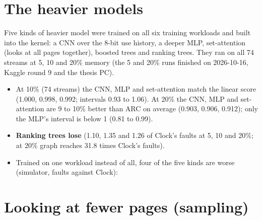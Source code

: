 \documentclass[10.5pt,a4paper]{article}
\begin{document}
\section{The heavier models}
\label{sec:nets}

Five kinds of heavier model were trained on all six training workloads and built into the kernel: a CNN over the 8-bit use history, a deeper MLP, set-attention (looks at all pages together),
boosted trees and ranking trees. They ran on all 74 streams at 5, 10 and 20\% memory (the 5 and 20\% runs finished on 2026-10-16, Kaggle round 9 and the thesis PC).

\begin{table}[h]
\centering\scriptsize
\resizebox{\linewidth}{!}{}
\caption{5\% memory, all 74 streams.}
\end{table}
\begin{table}[h]
\centering\scriptsize
\resizebox{\linewidth}{!}{}
\caption{10\% memory, all 74 streams.}
\end{table}
\begin{table}[h]
\centering\scriptsize
\resizebox{\linewidth}{!}{}
\caption{20\% memory, all 74 streams.}
\end{table}

\begin{itemize}
\item At 10\% (74 streams) the CNN, MLP and set-attention match the linear score (1.000, 0.998, 0.992; intervals 0.93 to 1.06). At 20\% the CNN, MLP and set-attention are 9 to 10\% better than ARC on average (0.903, 0.906, 0.912); only the MLP's interval is below 1 (0.81 to 0.99).
\item \textbf{Ranking trees lose} (1.10, 1.35 and 1.26 of Clock's faults at 5, 10 and 20\%; at 20\% graph reaches 31.8 times Clock's faults).
\item Trained on one workload instead of all, four of the five kinds are worse (simulator, faults against Clock):
\end{itemize}

\begin{center}\small

\end{center}

\section{Looking at fewer pages (sampling)}
\label{sec:sampling}
\end{document}
